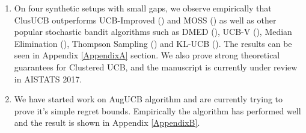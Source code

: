 \begin{enumerate}
\item On four synthetic setups with small gaps, we observe empirically that ClusUCB outperforms UCB-Improved (\cite{auer2010ucb}) and MOSS (\cite{audibert2009minimax}) as well as other popular stochastic bandit algorithms such as DMED (\cite{honda2010asymptotically}), UCB-V (\cite{audibert2009exploration}), Median Elimination (\cite{even2006action}), Thompson Sampling (\cite{agrawal2011analysis}) and KL-UCB (\cite{garivier2011kl}). The results can be seen in Appendix \ref{AppendixA} section. We also prove strong theoretical guarantees for Clustered UCB, and the manuscript is currently under review in AISTATS 2017.
\item We have started work on AugUCB algorithm and are currently trying to prove it's simple regret bounds. Empirically the algorithm has performed well and the result is shown in Appendix \ref{AppendixB}. 
\end{enumerate}


